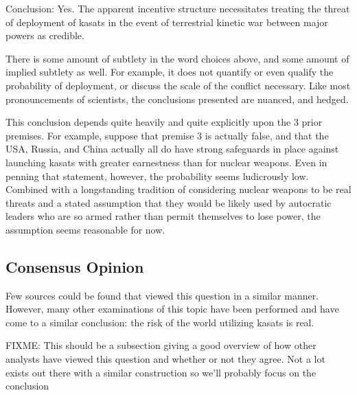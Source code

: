 Conclusion: Yes.  The apparent incentive structure necessitates
treating the threat of deployment of \acp{kasat} in the event of
terrestrial kinetic war between major powers as credible.

There is some amount of subtlety in the word choices above, and some
amount of implied subtlety as well.  For example, it does not quantify
or even qualify the probability of deployment, or discuss the scale of
the conflict necessary.  Like most pronouncements of scientists, the
conclusions presented are nuanced, and hedged.

This conclusion depends quite heavily and quite explicitly upon the 3
prior premises.  For example, suppose that premise 3 is actually
false, and that the USA, Russia, and China actually all do have strong
safeguards in place against launching \acp{kasat} with greater
earnestness than for nuclear weapons.  Even in penning that statement,
however, the probability seems ludicrously low.  Combined with a
longstanding tradition of considering nuclear weapons to be real
threats and a stated assumption that they would be likely used by
autocratic leaders who are so armed rather than permit themselves to
lose power\cite[that colonel]{xxx}, the assumption seems reasonable
for now.

\subsection{Consensus Opinion}

Few sources could be found that viewed this question in a similar
manner.  However, many other examinations of this topic have been
performed and have come to a similar conclusion: the risk of the world
utilizing \acp{kasat} is real.

FIXME: This should be a subsection giving a good overview of how other
analysts have viewed this question and whether or not they agree.  Not
a lot exists out there with a similar construction so we'll probably
focus on the conclusion

